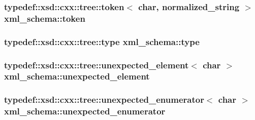 \subsubsection[{\texorpdfstring{token}{token}}]{\setlength{\rightskip}{0pt plus 5cm}typedef\+::xsd\+::cxx\+::tree\+::token$<$ char, {\bf normalized\+\_\+string} $>$ {\bf xml\+\_\+schema\+::token}}\hypertarget{namespacexml__schema_aac8666db04b41e8b19afa60d8ecb1e89}{}\label{namespacexml__schema_aac8666db04b41e8b19afa60d8ecb1e89}
\subsubsection[{\texorpdfstring{type}{type}}]{\setlength{\rightskip}{0pt plus 5cm}typedef\+::xsd\+::cxx\+::tree\+::type {\bf xml\+\_\+schema\+::type}}\hypertarget{namespacexml__schema_a4bf7f144ce936a6a393de26f4cb707f0}{}\label{namespacexml__schema_a4bf7f144ce936a6a393de26f4cb707f0}
\subsubsection[{\texorpdfstring{unexpected\+\_\+element}{unexpected_element}}]{\setlength{\rightskip}{0pt plus 5cm}typedef\+::xsd\+::cxx\+::tree\+::unexpected\+\_\+element$<$ char $>$ {\bf xml\+\_\+schema\+::unexpected\+\_\+element}}\hypertarget{namespacexml__schema_a381b3f3410f9f6ba1f44c5500d90345b}{}\label{namespacexml__schema_a381b3f3410f9f6ba1f44c5500d90345b}
\subsubsection[{\texorpdfstring{unexpected\+\_\+enumerator}{unexpected_enumerator}}]{\setlength{\rightskip}{0pt plus 5cm}typedef\+::xsd\+::cxx\+::tree\+::unexpected\+\_\+enumerator$<$ char $>$ {\bf xml\+\_\+schema\+::unexpected\+\_\+enumerator}}\hypertarget{namespacexml__schema_a7601f5d15eeb816df6a0e1cb2b0f379b}{}\label{namespacexml__schema_a7601f5d15eeb816df6a0e1cb2b0f379b}
